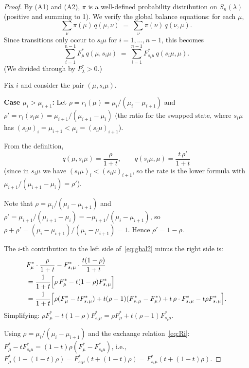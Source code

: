 \documentclass[12pt]{article}
\theoremstyle{definition}
\theoremstyle{remark}
\begin{document}
\begin{proof}
By (A1) and (A2), $\pi$ is a well-defined probability distribution on
$S_n(\lambda)$ (positive and summing to 1).  We verify the global balance
equations: for each $\mu$,
\begin{equation}\label{eq:gbal}
  \sum_{\nu} \pi(\mu)\,q(\mu,\nu)
  \;=\;
  \sum_{\nu} \pi(\nu)\,q(\nu,\mu).
\end{equation}
Since transitions only occur to $s_i\mu$ for $i=1,\dots,n-1$, this becomes
\begin{equation}\label{eq:gbal2}
  \sum_{i=1}^{n-1} F^*_\mu\,q(\mu,s_i\mu)
  \;=\;
  \sum_{i=1}^{n-1} F^*_{s_i\mu}\,q(s_i\mu,\mu).
\end{equation}
(We divided through by $P^*_\lambda > 0$.)

Fix $i$ and consider the pair $(\mu, s_i\mu)$.

\textbf{Case $\mu_i > \mu_{i+1}$:}
Let $\rho = r_i(\mu) = \mu_i/(\mu_i-\mu_{i+1})$ and
$\rho' = r_i(s_i\mu) = \mu_{i+1}/(\mu_{i+1}-\mu_i)$ (the ratio for the
swapped state, where $s_i\mu$ has $(s_i\mu)_i = \mu_{i+1} < \mu_i = (s_i\mu)_{i+1}$).

From the definition,
\[
  q(\mu,s_i\mu) = \frac{\rho}{1+t},
  \qquad
  q(s_i\mu,\mu) = \frac{t\,\rho'}{1+t}
\]
(since in $s_i\mu$ we have $(s_i\mu)_i < (s_i\mu)_{i+1}$, so the rate is the
lower formula with $\mu_{i+1}/(\mu_{i+1}-\mu_i) = \rho'$).

Note that $\rho = \mu_i/(\mu_i-\mu_{i+1})$ and $\rho' = \mu_{i+1}/(\mu_{i+1}-\mu_i)
= -\mu_{i+1}/(\mu_i-\mu_{i+1})$, so $\rho + \rho' = (\mu_i - \mu_{i+1})/(\mu_i-\mu_{i+1}) = 1$.
Hence $\rho' = 1-\rho$.

The $i$-th contribution to the left side of~\eqref{eq:gbal2} minus the right
side is:
\begin{align}
  &F^*_\mu\cdot\frac{\rho}{1+t} - F^*_{s_i\mu}\cdot\frac{t(1-\rho)}{1+t}
  \nonumber\\
  &= \frac{1}{1+t}\Bigl[\rho\,F^*_\mu - t(1-\rho)F^*_{s_i\mu}\Bigr]
  \nonumber\\
  &= \frac{1}{1+t}\Bigl[\rho(F^*_\mu - tF^*_{s_i\mu}) + t(\rho-1)(F^*_{s_i\mu}-F^*_\mu)
     + t\,\rho\cdot F^*_{s_i\mu} - t\rho F^*_{s_i\mu}\Bigr].
  \nonumber
\end{align}
Simplifying: $\rho F^*_\mu - t(1-\rho)F^*_{s_i\mu} = \rho F^*_\mu + t(\rho-1)F^*_{s_i\mu}$.

Using $\rho = \mu_i/(\mu_i-\mu_{i+1})$ and the exchange relation~\eqref{eq:Ri}:
$F^*_\mu - tF^*_{s_i\mu} = (1-t)\rho(F^*_\mu - F^*_{s_i\mu})$, i.e.,
$F^*_\mu(1-(1-t)\rho) = F^*_{s_i\mu}(t + (1-t)\rho) = F^*_{s_i\mu}(t + (1-t)\rho)$.


\end{proof}
\end{document}
